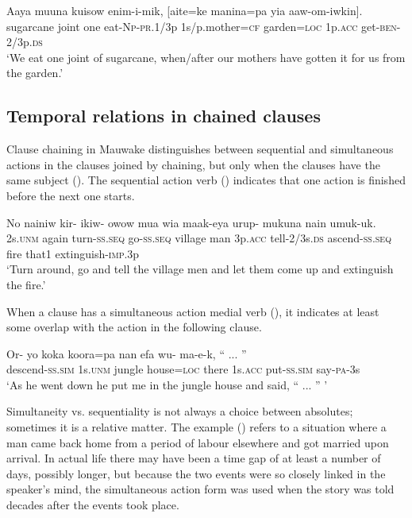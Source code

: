 \ea%
\label{ex:x1470}
\gll Aaya  muuna  kuisow  enim-i-mik,  [aite=ke manina=pa  yia  aaw-om-iwkin].   \\
sugarcane  joint  one  eat-\textsc{Np}-\textsc{pr}.1/3p 1s/p.mother=\textsc{cf} garden=\textsc{loc} 1p.\textsc{acc} get-\textsc{ben}-2/3p.\textsc{ds}\\
\glt`We eat one joint of sugarcane, when/after our mothers have gotten it for us from the garden.'
\z


\subsection{Temporal relations in chained clauses}

Clause chaining in Mauwake distinguishes between sequential and simultaneous actions in the clauses joined by chaining, but only when the clauses have the same subject (). The sequential action verb () indicates that one action is finished before the next one starts. 

\ea%
\label{ex:x1431}
\gll No  nainiw  kir-  ikiw-  owow  mua  wia maak-eya  urup-  mukuna  nain  umuk-uk. \\
2s.\textsc{unm} again  turn-\textsc{ss}.\textsc{seq} go-\textsc{ss}.\textsc{seq} village  man  3p.\textsc{acc} tell-2/3s.\textsc{ds}  ascend-\textsc{ss}.\textsc{seq} fire  that1 extinguish-\textsc{imp}.3p\\
\glt`Turn around, go and tell the village men and let them come up and extinguish the fire.'
\z


When a clause has a simultaneous action medial verb (), it indicates at least some overlap with the action in the following clause. 

\ea%
\label{ex:x1432}
\gll Or-  yo  koka  koora=pa  nan  efa wu-  ma-e-k,  `` ... '' \\
descend-\textsc{ss}.\textsc{sim} 1s.\textsc{unm} jungle house=\textsc{loc} there 1s.\textsc{acc} put-\textsc{ss}.\textsc{sim} say-\textsc{pa}-3s\\
\glt`As he went down he put me in the jungle house and said, `` ... '' '
\z


Simultaneity vs. sequentiality is not always a choice between absolutes; sometimes it is a relative matter. The example () refers to a situation where a man came back home from a period of labour elsewhere and got married upon arrival. In actual life there may have been a time gap of at least a number of days, possibly longer, but because the two events were so closely linked in the speaker's mind, the simultaneous action form was used when the story was told decades after the events took place.

